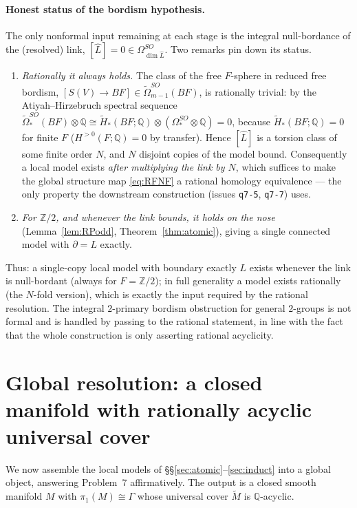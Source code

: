 \documentclass[12pt]{article}
\theoremstyle{definition}
\begin{document}
\paragraph{Honest status of the bordism hypothesis.}
The only nonformal input remaining at each stage is the integral
null-bordance of the (resolved) link, $[\widehat L]=0\in\Omega^{SO}_{\dim
\widehat L}$. Two remarks pin down its status.
\begin{enumerate}
\item \emph{Rationally it always holds.} The class of the free $F$-sphere in
reduced free bordism, $[S(V)\to BF]\in\widetilde\Omega^{SO}_{m-1}(BF)$, is
rationally trivial: by the Atiyah--Hirzebruch spectral sequence
$\widetilde\Omega^{SO}_*(BF)\otimes\mathbb{Q}\cong
\widetilde H_*(BF;\mathbb{Q})\otimes(\Omega^{SO}_*\otimes\mathbb{Q})=0$, because
$\widetilde H_*(BF;\mathbb{Q})=0$ for finite $F$ ($H^{>0}(F;\mathbb{Q})=0$ by
transfer). Hence $[\widehat L]$ is a torsion class of some finite order $N$, and
$N$ disjoint copies of the model bound. Consequently a local model exists
\emph{after multiplying the link by $N$}, which suffices to make the global
structure map \eqref{eq:RFNF} a rational homology equivalence --- the only
property the downstream construction (issues \texttt{q7-5}, \texttt{q7-7}) uses.
\item \emph{For $\mathbb{Z}/2$, and whenever the link bounds, it holds on the
nose} (Lemma~\ref{lem:RPodd}, Theorem~\ref{thm:atomic}), giving a single
connected model with $\partial=L$ exactly.
\end{enumerate}
Thus: a single-copy local model with boundary exactly $L$ exists whenever the
link is null-bordant (always for $F=\mathbb{Z}/2$); in full generality a model
exists rationally (the $N$-fold version), which is exactly the input required by
the rational resolution. The integral $2$-primary bordism obstruction for
general $2$-groups is not formal and is handled by passing to the rational
statement, in line with the fact that the whole construction is only asserting
rational acyclicity.

\section{Global resolution: a closed manifold with rationally acyclic
universal cover}\label{sec:global}

We now assemble the local models of \S\S\ref{sec:atomic}--\ref{sec:induct} into
a global object, answering Problem~7 affirmatively. The output is a closed smooth
manifold $M$ with $\pi_1(M)\cong\Gamma$ whose universal cover $\widetilde M$ is
$\mathbb{Q}$-acyclic.
\end{document}
